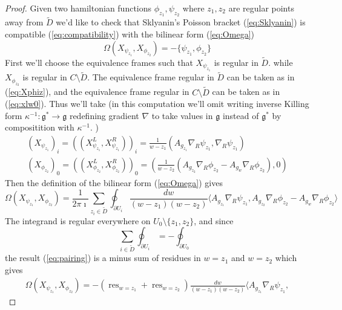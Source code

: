 \documentclass[11pt, oneside, reqno]{amsart}
\theoremstyle{definition} \newtheorem{definition}{Definition}[section]
\theoremstyle{definition} \newtheorem{remark}[definition]{Remark}
\theoremstyle{definition} \newtheorem{remarks}[definition]{Remarks}
\theoremstyle{definition} \newtheorem{question}[definition]{Question}
\theoremstyle{definition} \newtheorem*{note}{Note}
\theoremstyle{definition} \newtheorem{example}[definition]{Example}
\theoremstyle{definition} \newtheorem{examples}[definition]{Examples}
\renewcommand{\gg}{\mathfrak{g}}
\DeclareMathOperator{\res}{res}
\begin{document}
\begin{proof}
  Given two hamiltonian functions $\phi_{z_1}, \psi_{z_2}$ where $z_1, z_2$ are regular
  points away from $\tilde D$ we'd like to check
  that Sklyanin's Poisson bracket (\ref{eq:Sklyanin})  
is compatible (\ref{eq:compatibility}) with the bilinear form  (\ref{eq:Omega})
\begin{equation}
  \Omega(X_{\psi_{z_1}}, X_{\phi_{z_2}})  = - \{\psi_{z_1}, \phi_{z_2}\}
\end{equation}
First we'll choose the equivalence frames such that $X_{\psi_{z_1}}$ is regular in $\tilde D$. 
while $X_{\phi_{z_2}}$ is regular in $C \setminus \tilde D$.
The equivalence frame regular in $\tilde D$ can be taken as in  (\ref{eq:Xphiz}),
and the equivalence frame regular in $C \setminus \tilde D$ can be taken
as in (\ref{eq:xlw0}). Thus we'll take (in this computation we'll omit writing inverse
Killing form $\kappa^{-1}: \gg^{*} \to \gg $ redefining gradient $\nabla$ to take values in $\gg$ instead of $\gg^{*}$
by compositition with $\kappa^{-1}$. )
\begin{equation}
  \begin{aligned}
    (X_{\psi_{z_1}})_{i} = ((X_{\psi_{z_1}}^{L}, X_{\psi_{z_1}}^{R}))_{i} =  \frac{1}{w - z_1} (A_{g_{z_1}} \nabla_R \psi_{z_1},   \nabla_{R} \psi_{z_1}) \\
    (X_{\phi_{z_2}})_{0} = ((X_{\phi_{z_2}}^{L}, X_{\phi_{z_2}}^{R}))_{0} = ( \frac{1}{w - z_2} ( A_{g_{z_2}} \nabla_R \phi_{z_2} - A_{g_{w}} \nabla_{R} \phi_{z_2}), 0) 
  \end{aligned}
\end{equation}
Then the definition of the bilinear form (\ref{eq:Omega}) gives
\begin{equation}
  \label{eq:pairing}
  \Omega(X_{\psi_{z_1}}, X_{\phi_{z_2}}) = \frac{1}{2 \pi \imath }
  \sum_{z_i \in \tilde D} \oint_{\partial U_i} \frac{dw }{(w - z_1)(w - z_2)} \langle A_{g_{z_1}} \nabla_{R} \psi_{z_1},
  A_{g_{z_2}} \nabla_{R} \phi_{z_2}  - A_{g_w} \nabla_{R} \phi_{z_2} \rangle
\end{equation}
The integrand is regular everywhere on $U_0 \setminus \{z_1, z_2\}$, and since
\begin{equation}
\label{eq:residue}
  \sum_{i \in \tilde D} \oint_{\partial U_i }  = - \oint_{\partial U_0} 
\end{equation}
the result (\ref{eq:pairing}) is a minus sum of residues in $w = z_1$ and $w = z_2$
which gives
  \begin{multline}
\label{eq:z1z2residue}
   \Omega(X_{\psi_{z_1}}, X_{\phi_{z_2}}) = - (\res_{w = z_1}  + \res_{w = z_2}) \frac{dw }{(w - z_1)(w - z_2)} \langle A_{g_{z_1}} \nabla_{R} \psi_{z_1},

\end{multline}
\end{proof}
\end{document}
